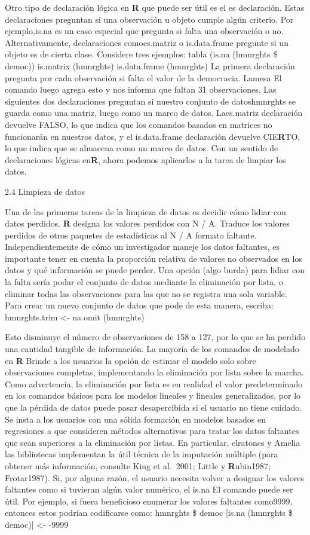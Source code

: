 \documentclass[
]{book}
\begin{document}
Otro tipo de declaración lógica en \textbf{R} que puede ser útil es el es declaración.
Estas declaraciones preguntan si una observación u objeto cumple algún criterio. Por ejemplo,is.na es un caso especial que pregunta si falta una observación o no. Alternativamente, declaraciones comoes.matriz o is.data.frame pregunte si un objeto es de cierta clase. Considere tres ejemplos:
tabla (is.na (hmnrghts \$ democ)) is.matrix (hmnrghts) is.data.frame (hmnrghts)
La primera declaración pregunta por cada observación si falta el valor de la democracia. Lamesa El comando luego agrega esto y nos informa que faltan 31 observaciones. Las siguientes dos declaraciones preguntan si nuestro conjunto de datoshmnrghts
se guarda como una matriz, luego como un marco de datos. Laes.matriz declaración devuelve FALSO, lo que indica que los comandos basados en matrices no funcionarán en nuestros datos, y el is.data.frame declaración devuelve CIE\textbf{R}TO, lo que indica que se almacena como un marco de datos. Con un sentido de declaraciones lógicas en\textbf{R}, ahora podemos aplicarlos a la tarea de limpiar los datos.

2.4 Limpieza de datos

Una de las primeras tareas de la limpieza de datos es decidir cómo lidiar con datos perdidos. \textbf{R} designa los valores perdidos con N / A. Traduce los valores perdidos de otros paquetes de estadísticas al N / A formato faltante. Independientemente de cómo un investigador maneje los datos faltantes, es importante tener en cuenta la proporción relativa de valores no observados en los datos y qué información se puede perder. Una opción (algo burda) para lidiar con la falta sería podar el conjunto de datos mediante la eliminación por lista, o eliminar todas las observaciones para las que no se registra una sola variable. Para crear un nuevo conjunto de datos que pode de esta manera, escriba:
hmnrghts.trim \textless- na.omit (hmnrghts)

Esto disminuye el número de observaciones de 158 a 127, por lo que se ha perdido una cantidad tangible de información.
La mayoría de los comandos de modelado en \textbf{R} Brinde a los usuarios la opción de estimar el modelo solo sobre observaciones completas, implementando la eliminación por lista sobre la marcha. Como advertencia, la eliminación por lista es en realidad el valor predeterminado en los comandos básicos para los modelos lineales y lineales generalizados, por lo que la pérdida de datos puede pasar desapercibida si el usuario no tiene cuidado. Se insta a los usuarios con una sólida formación en modelos basados en regresiones a que consideren métodos alternativos para tratar los datos faltantes que sean superiores a la eliminación por listas. En particular, elratones y Amelia las bibliotecas implementan la útil técnica de la imputación múltiple (para obtener más información, consulte King et al.~2001; Little y \textbf{R}ubin1987; Frotar1987).
Si, por alguna razón, el usuario necesita volver a designar los valores faltantes como si tuvieran algún valor numérico, el is.na El comando puede ser útil. Por ejemplo, si fuera beneficioso enumerar los valores faltantes como9999, entonces estos podrían codificarse como:
hmnrghts \$ democ {[}is.na (hmnrghts \$ democ){]} \textless- -9999
\end{document}
